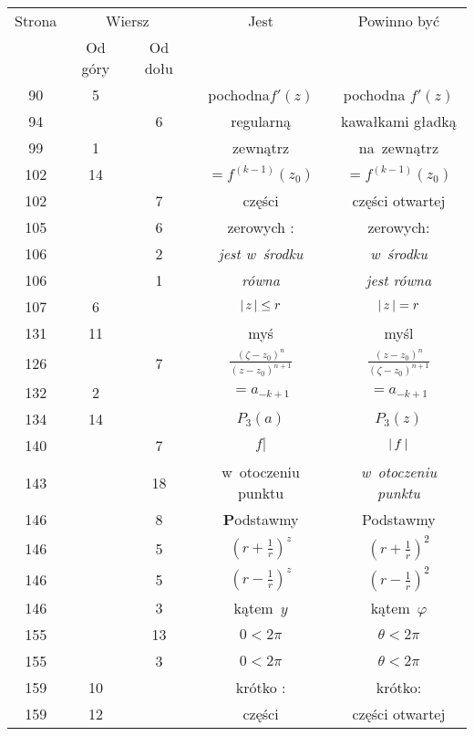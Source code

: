\documentclass[a4paper,11pt]{article}
\begin{document}
\begin{center}
  \begin{tabular}{|c|c|c|c|c|}
    \hline
    Strona & \multicolumn{2}{c|}{Wiersz} & Jest
                              & Powinno być \\ \cline{2-3}
    & Od góry & Od dołu & & \\
    \hline
    90  &  5 & & pochodna$f'( z )$ & pochodna $f'( z )$ \\
    94  & &  6 & regularną & kawałkami gładką \\
    99  &  1 & & zewnątrz & na~zewnątrz \\
    102 & 14 & & $=\!\! f^{ ( k - 1 ) }( z_{ 0 } )$
           & $= f^{ ( k - 1 ) }( z_{ 0 } )$ \\
    102 & &  7 & części & części otwartej \\
    105 & &  6 & zerowych : & zerowych: \\
    106 & &  2 & \textit{jest w~środku} & \textit{w~środku} \\
    106 & &  1 & \textit{równa} & \textit{jest równa} \\
    107 &  6 & & $|\, {  z  } \,| \leq r$ & $|\, {  z  } \,| = r$ \\
    131 & 11 & & myś & myśl \\
    126 & &  7 & $\frac{ ( \zeta - z_{ 0 } )^{ n } }{ ( z - z_{ 0 } )^{ n + 1 } }$
           & $\frac{ ( z - z_{ 0 } )^{ n } }{ ( \zeta - z_{ 0 } )^{ n + 1 } }$ \\
    132 &  2 & & $=\!\! a_{ -k + 1 }$ & $= a_{ -k + 1 }$ \\
    134 & 14 & & $P_{ 3 }( a )$ & $P_{ 3 }( z )$ \\
    140 & &  7 & $f |$ & $|\, {  f  } \,|$ \\
    143 & & 18 & w~otoczeniu punktu & \textit{w~otoczeniu punktu} \\
    146 & &  8 & \textbf{P}odstawmy & Podstawmy \\
    146 & &  5 & $( r + \frac{ 1 }{ r } )^{ z }$
           & $( r + \frac{ 1 }{ r } )^{ 2 }$ \\
    146 & &  5 & $( r - \frac{ 1 }{ r } )^{ z }$
           & $( r - \frac{ 1 }{ r } )^{ 2 }$ \\
    146 & &  3 & kątem~$y$ & kątem~$\varphi$ \\
    155 & & 13 & $0 < 2\pi$ & $\theta < 2\pi$ \\
    155 & &  3 & $0 < 2\pi$ & $\theta < 2\pi$ \\
    159 & 10 & & krótko : & krótko: \\
    159 & 12 & & części & części otwartej \\

\end{tabular}
\end{center}
\end{document}
